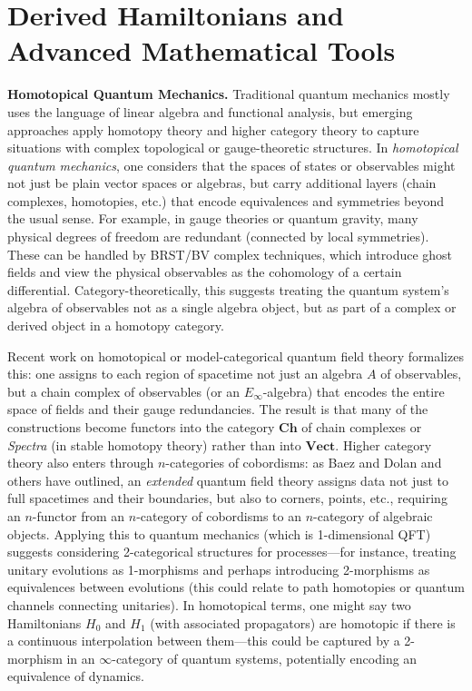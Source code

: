 \documentclass[12pt]{article}
\begin{document}

\section{Derived Hamiltonians and Advanced Mathematical Tools}

\textbf{Homotopical Quantum Mechanics.} Traditional quantum mechanics mostly uses the language of linear algebra and functional analysis, but emerging approaches apply homotopy theory and higher category theory to capture situations with complex topological or gauge-theoretic structures. In \emph{homotopical quantum mechanics}, one considers that the spaces of states or observables might not just be plain vector spaces or algebras, but carry additional layers (chain complexes, homotopies, etc.) that encode equivalences and symmetries beyond the usual sense. For example, in gauge theories or quantum gravity, many physical degrees of freedom are redundant (connected by local symmetries). These can be handled by BRST/BV complex techniques, which introduce ghost fields and view the physical observables as the cohomology of a certain differential. Category-theoretically, this suggests treating the quantum system’s algebra of observables not as a single algebra object, but as part of a complex or derived object in a homotopy category.

Recent work on homotopical or model-categorical quantum field theory formalizes this: one assigns to each region of spacetime not just an algebra $A$ of observables, but a chain complex of observables (or an $E_\infty$-algebra) that encodes the entire space of fields and their gauge redundancies. The result is that many of the constructions become functors into the category $\mathbf{Ch}$ of chain complexes or \emph{Spectra} (in stable homotopy theory) rather than into $\mathbf{Vect}$. Higher category theory also enters through $n$-categories of cobordisms: as Baez and Dolan and others have outlined, an \emph{extended} quantum field theory assigns data not just to full spacetimes and their boundaries, but also to corners, points, etc., requiring an $n$-functor from an $n$-category of cobordisms to an $n$-category of algebraic objects. Applying this to quantum mechanics (which is 1-dimensional QFT) suggests considering 2-categorical structures for processes---for instance, treating unitary evolutions as 1-morphisms and perhaps introducing 2-morphisms as equivalences between evolutions (this could relate to path homotopies or quantum channels connecting unitaries). In homotopical terms, one might say two Hamiltonians $H_0$ and $H_1$ (with associated propagators) are homotopic if there is a continuous interpolation between them---this could be captured by a 2-morphism in an $\infty$-category of quantum systems, potentially encoding an equivalence of dynamics.
\end{document}
